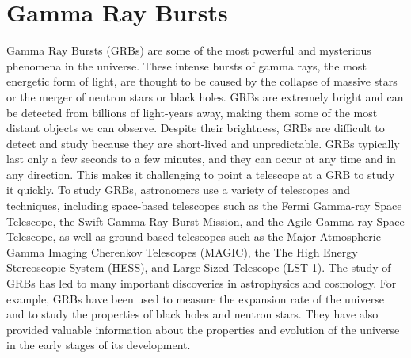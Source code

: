 \section{Gamma Ray Bursts}
\label{s:Gamma-Ray-Bursts}
Gamma Ray Bursts (GRBs) are some of the most powerful and mysterious phenomena in the universe. These intense bursts of gamma rays, the most energetic form of light, are thought to be caused by the collapse of massive stars or the merger of neutron stars or black holes. GRBs are extremely bright and can be detected from billions of light-years away, making them some of the most distant objects we can observe.
Despite their brightness, GRBs are difficult to detect and study because they are short-lived and unpredictable. GRBs typically last only a few seconds to a few minutes, and they can occur at any time and in any direction. This makes it challenging to point a telescope at a GRB to study it quickly.
To study GRBs, astronomers use a variety of telescopes and techniques, including space-based telescopes such as the Fermi Gamma-ray Space Telescope, the Swift Gamma-Ray Burst Mission, and the Agile Gamma-ray Space Telescope, as well as ground-based telescopes such as the Major Atmospheric Gamma Imaging Cherenkov Telescopes (MAGIC), the The High Energy Stereoscopic System (HESS), and Large-Sized Telescope (LST-1). 
The study of GRBs has led to many important discoveries in astrophysics and cosmology. For example, GRBs have been used to measure the expansion rate of the universe and to study the properties of black holes and neutron stars. They have also provided valuable information about the properties and evolution of the universe in the early stages of its development.

